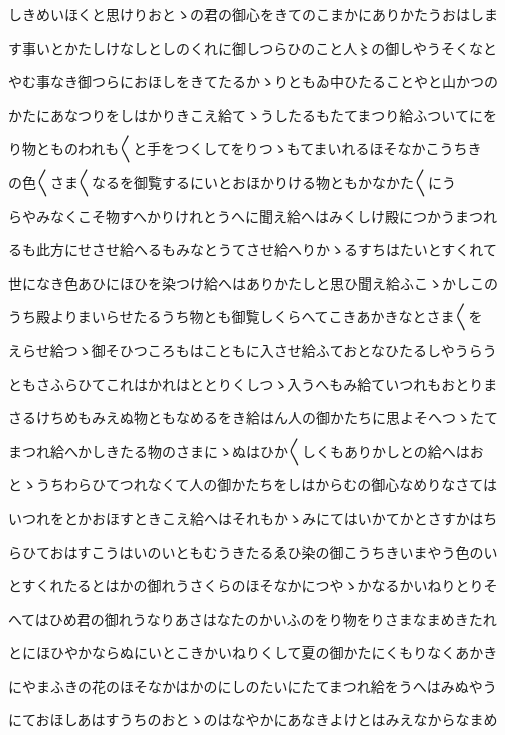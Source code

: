 \documentclass[a4paper,11pt,landscape]{ltjtarticle}
\begin{document}
しきめいほくと思けりおとゝの君の御心をきてのこまかにありかたうおはしま
\par\medskip
す事いとかたしけなしとしのくれに御しつらひのこと人〻の御しやうそくなと
\par\medskip
やむ事なき御つらにおほしをきてたるかゝりともゐ中ひたることやと山かつの
\par\medskip
かたにあなつりをしはかりきこえ給てゝうしたるもたてまつり給ふついてにを
\par\medskip
り物とものわれも〱と手をつくしてをりつゝもてまいれるほそなかこうちき
\par\medskip
の色〱さま〱なるを御覧するにいとおほかりける物ともかなかた〱にう
\par\medskip
らやみなくこそ物すへかりけれとうへに聞え給へはみくしけ殿につかうまつれ
\par\medskip
るも此方にせさせ給へるもみなとうてさせ給へりかゝるすちはたいとすくれて
\par\medskip
世になき色あひにほひを染つけ給へはありかたしと思ひ聞え給ふこゝかしこの
\par\medskip
うち殿よりまいらせたるうち物とも御覧しくらへてこきあかきなとさま〱を
\par\medskip
えらせ給つゝ御そひつころもはこともに入させ給ふておとなひたるしやうらう
\par\medskip
ともさふらひてこれはかれはととりくしつゝ入うへもみ給ていつれもおとりま
\par\medskip
さるけちめもみえぬ物ともなめるをき給はん人の御かたちに思よそへつゝたて
\par\medskip
まつれ給へかしきたる物のさまにゝぬはひか〱しくもありかしとの給へはお
\par\medskip
とゝうちわらひてつれなくて人の御かたちをしはからむの御心なめりなさては
\par\medskip
いつれをとかおほすときこえ給へはそれもかゝみにてはいかてかとさすかはち
\par\medskip
らひておはすこうはいのいともむうきたるゑひ染の御こうちきいまやう色のい
\par\medskip
とすくれたるとはかの御れうさくらのほそなかにつやゝかなるかいねりとりそ
\par\medskip
へてはひめ君の御れうなりあさはなたのかいふのをり物をりさまなまめきたれ
\par\medskip
とにほひやかならぬにいとこきかいねりくして夏の御かたにくもりなくあかき
\par\medskip
にやまふきの花のほそなかはかのにしのたいにたてまつれ給をうへはみぬやう
\par\medskip
にておほしあはすうちのおとゝのはなやかにあなきよけとはみえなからなまめ
\end{document}
